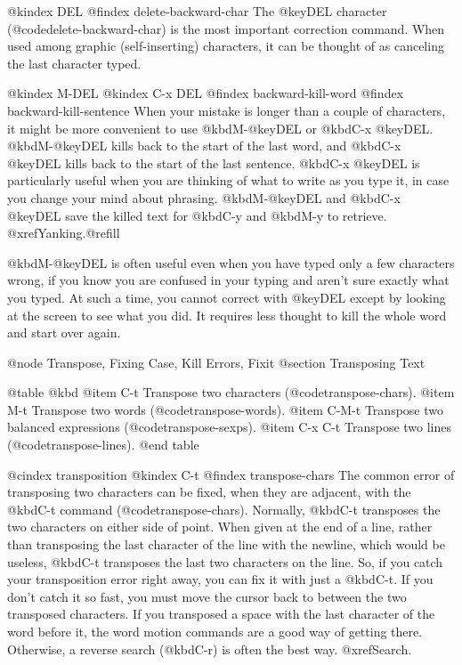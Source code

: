 {{{{{{{{{{{{{{{{{{{@kindex DEL
@findex delete-backward-char
  The @key{DEL} character (@code{delete-backward-char}) is the most
important correction command.  When used among graphic (self-inserting)
characters, it can be thought of as canceling the last character typed.

@kindex M-DEL
@kindex C-x DEL
@findex backward-kill-word
@findex backward-kill-sentence
  When your mistake is longer than a couple of characters, it might be more
convenient to use @kbd{M-@key{DEL}} or @kbd{C-x @key{DEL}}.
@kbd{M-@key{DEL}} kills back to the start of the last word, and @kbd{C-x
@key{DEL}} kills back to the start of the last sentence.  @kbd{C-x
@key{DEL}} is particularly useful when you are thinking of what to write as
you type it, in case you change your mind about phrasing.
@kbd{M-@key{DEL}} and @kbd{C-x @key{DEL}} save the killed text for
@kbd{C-y} and @kbd{M-y} to retrieve.  @xref{Yanking}.@refill

  @kbd{M-@key{DEL}} is often useful even when you have typed only a few
characters wrong, if you know you are confused in your typing and aren't
sure exactly what you typed.  At such a time, you cannot correct with
@key{DEL} except by looking at the screen to see what you did.  It requires
less thought to kill the whole word and start over again.

@node Transpose, Fixing Case, Kill Errors, Fixit
@section Transposing Text

@table @kbd
@item C-t
Transpose two characters (@code{transpose-chars}).
@item M-t
Transpose two words (@code{transpose-words}).
@item C-M-t
Transpose two balanced expressions (@code{transpose-sexps}).
@item C-x C-t
Transpose two lines (@code{transpose-lines}).
@end table

@cindex transposition
@kindex C-t
@findex transpose-chars
  The common error of transposing two characters can be fixed, when they
are adjacent, with the @kbd{C-t} command (@code{transpose-chars}).  Normally,
@kbd{C-t} transposes the two characters on either side of point.  When
given at the end of a line, rather than transposing the last character of
the line with the newline, which would be useless, @kbd{C-t} transposes the
last two characters on the line.  So, if you catch your transposition error
right away, you can fix it with just a @kbd{C-t}.  If you don't catch it so
fast, you must move the cursor back to between the two transposed
characters.  If you transposed a space with the last character of the word
before it, the word motion commands are a good way of getting there.
Otherwise, a reverse search (@kbd{C-r}) is often the best way.
@xref{Search}.


}}}}}}}}}}}}}}}}}}}

